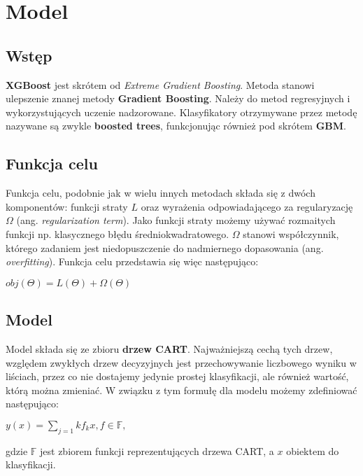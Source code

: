 \documentclass[a4paper,12p]{article}
\begin{document}
\section{Model}

\subsection{Wstęp}

\textbf{XGBoost} jest skrótem od \textit{Extreme Gradient Boosting}. Metoda stanowi ulepszenie znanej metody \textbf{Gradient Boosting}. Należy do metod regresyjnych i wykorzystujących uczenie nadzorowane. Klasyfikatory otrzymywane przez metodę nazywane są zwykle \textbf{boosted trees}, funkcjonując również pod skrótem \textbf{GBM}.

\subsection{Funkcja celu}

Funkcja celu, podobnie jak w wielu innych metodach składa się z dwóch komponentów: funkcji straty $L$ oraz wyrażenia odpowiadającego za regularyzację $\Omega$ (ang. \textit{regularization term}). Jako funkcji straty możemy używać rozmaitych funkcji np. klasycznego błędu średniokwadratowego. $\Omega$ stanowi współczynnik, którego zadaniem jest niedopuszczenie do nadmiernego dopasowania (ang. \textit{overfitting}). Funkcja celu przedstawia się więc następująco:

\begin{center}
	$obj(\Theta)=L(\Theta)+\Omega(\Theta)$
\end{center}

\subsection{Model}

Model składa się ze zbioru \textbf{drzew CART}. Najważniejszą cechą tych drzew, względem zwykłych drzew decyzyjnych jest przechowywanie liczbowego wyniku w liściach, przez co nie dostajemy jedynie prostej klasyfikacji, ale również wartość, którą można zmieniać. W związku z tym formułę dla modelu możemy zdefiniować następująco:

\begin{center}
	$y(x) = \sum_{j=1}{k} f_k{x}, f \in \mathbb{F},$
\end{center}

gdzie $\mathbb{F}$ jest zbiorem funkcji reprezentujących drzewa CART, a $x$ obiektem do klasyfikacji.
\end{document}

